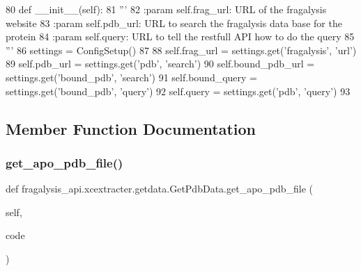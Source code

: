 \begin{DoxyCode}
80     \textcolor{keyword}{def }\_\_init\_\_(self):
81         \textcolor{stringliteral}{'''}
82 \textcolor{stringliteral}{        :param self.frag\_url: URL of the fragalysis website}
83 \textcolor{stringliteral}{        :param self.pdb\_url: URL to search the fragalysis data base for the protein}
84 \textcolor{stringliteral}{        :param self.query: URL to tell the restfull API how to do the query}
85 \textcolor{stringliteral}{        '''}
86         settings = ConfigSetup()
87 
88         self.frag\_url = settings.get(\textcolor{stringliteral}{'fragalysis'}, \textcolor{stringliteral}{'url'})
89         self.pdb\_url = settings.get(\textcolor{stringliteral}{'pdb'}, \textcolor{stringliteral}{'search'})
90         self.bound\_pdb\_url = settings.get(\textcolor{stringliteral}{'bound\_pdb'}, \textcolor{stringliteral}{'search'})
91         self.bound\_query = settings.get(\textcolor{stringliteral}{'bound\_pdb'}, \textcolor{stringliteral}{'query'})
92         self.query = settings.get(\textcolor{stringliteral}{'pdb'}, \textcolor{stringliteral}{'query'})
93 
\end{DoxyCode}


\subsection{Member Function Documentation}
\mbox{\label{classfragalysis__api_1_1xcextracter_1_1getdata_1_1_get_pdb_data_a1785640f7d8841b41773f04577065366}} 
\subsubsection{\texorpdfstring{get\+\_\+apo\+\_\+pdb\+\_\+file()}{get\_apo\_pdb\_file()}}
{\footnotesize\ttfamily def fragalysis\+\_\+api.\+xcextracter.\+getdata.\+Get\+Pdb\+Data.\+get\+\_\+apo\+\_\+pdb\+\_\+file (\begin{DoxyParamCaption}\item[{}]{self,  }\item[{}]{code }\end{DoxyParamCaption})}

